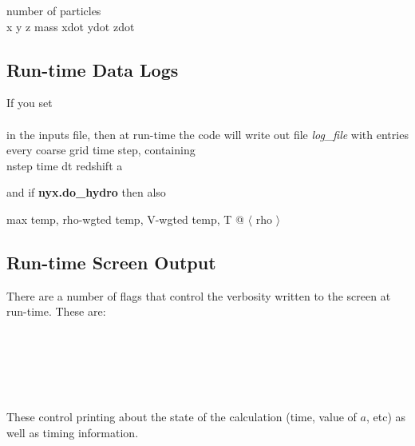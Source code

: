 \noindent number of particles \\ 
x y z mass xdot ydot zdot \\

\subsection{Run-time Data Logs}

If you set \\

  \\

\noindent in the inputs file, then at run-time the code will write out file
{\em log\_file} with entries every coarse
grid time step, containing \\

\noindent nstep  time   dt   redshift   a

and if {\bf nyx.do\_hydro} then also

\noindent max temp, rho-wgted temp, V-wgted temp, T @ $\langle$ rho $\rangle$

\subsection{Run-time Screen Output}

There are a number of flags that control the verbosity written to the screen at run-time.  These are:

 \\
 \\
 \\
 \\
 \\

These control printing  about the state of the calculation (time, value of $a$, etc) as well as
timing information.
